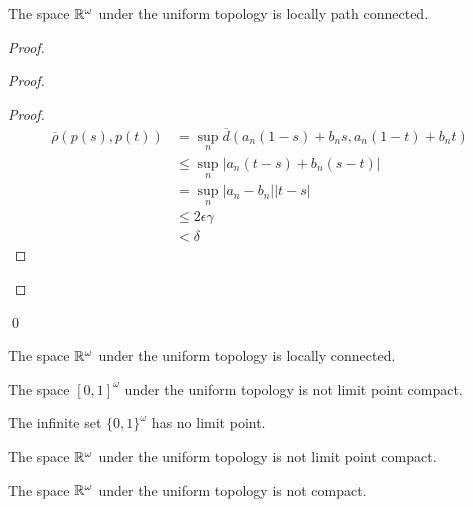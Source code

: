 \begin{proposition}
    The space $\mathbb{R}^\omega$ under the uniform topology is locally path connected.
\end{proposition}

\begin{proof}
    \pf
    \begin{proof}
        \begin{proof}
            \pf
            \begin{align*}
                \overline{\rho}(p(s),p(t))
                & = \sup_n \overline{d}(a_n(1-s)+b_ns,a_n(1-t)+b_nt) \\
                & \leq \sup_n |a_n(t-s) + b_n(s-t)| \\
                & = \sup_n |a_n - b_n||t-s| \\
                & \leq 2 \epsilon \gamma \\
                & < \delta
            \end{align*}
        \end{proof}
    \end{proof}
    \qed
\end{proof}

\begin{corollary}
    The space $\mathbb{R}^\omega$ under the uniform topology is locally connected.
\end{corollary}

\begin{example}
    The space $[0,1]^\omega$ under the uniform topology is not limit point compact.

    The infinite set $\{0,1\}^\omega$ has no limit point.
\end{example}

\begin{corollary}
    The space $\mathbb{R}^\omega$ under the uniform topology is not limit point compact.
\end{corollary}

\begin{corollary}
    The space $\mathbb{R}^\omega$ under the uniform topology is not compact.
\end{corollary}

